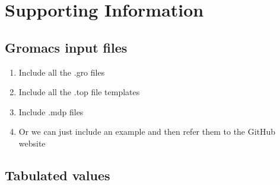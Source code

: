 \documentclass[preprint,review,12pt]{elsarticle}
\begin{document}
	\section{Supporting Information}
	
	\subsection{Gromacs input files}
	
	\begin{enumerate}
		\item Include all the .gro files
		\item Include all the .top file templates
		\item Include .mdp files
		\item Or we can just include an example and then refer them to the GitHub website
	\end{enumerate}
	
	\subsection{Tabulated values}
	
\end{document}
